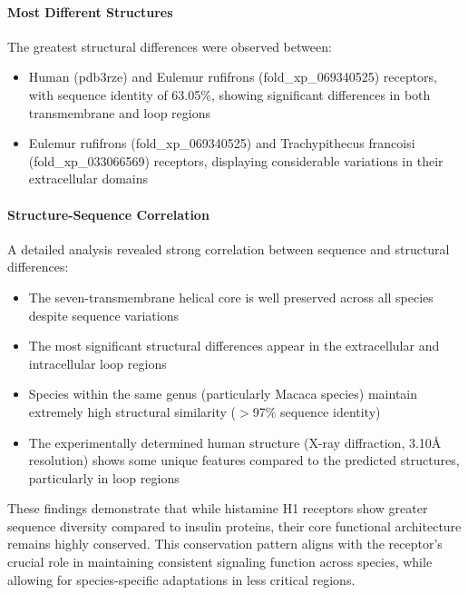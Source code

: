 \documentclass[11pt, a4paper, hidelinks]{article}
\begin{document}
\paragraph{Most Different Structures} The greatest structural differences were observed between:
\begin{itemize}
    \item Human (pdb3rze) and Eulemur rufifrons (fold\_xp\_069340525) receptors, with sequence identity of 63.05\%, showing significant differences in both transmembrane and loop regions
    \item Eulemur rufifrons (fold\_xp\_069340525) and Trachypithecus francoisi (fold\_xp\_033066569) receptors, displaying considerable variations in their extracellular domains
\end{itemize}

\paragraph{Structure-Sequence Correlation} A detailed analysis revealed strong correlation between sequence and structural differences:
\begin{itemize}
    \item The seven-transmembrane helical core is well preserved across all species despite sequence variations
    \item The most significant structural differences appear in the extracellular and intracellular loop regions
    \item Species within the same genus (particularly Macaca species) maintain extremely high structural similarity ($>$97\% sequence identity)
    \item The experimentally determined human structure (X-ray diffraction, 3.10\AA{} resolution) shows some unique features compared to the predicted structures, particularly in loop regions
\end{itemize}

These findings demonstrate that while histamine H1 receptors show greater sequence diversity compared to insulin proteins, their core functional architecture remains highly conserved. This conservation pattern aligns with the receptor's crucial role in maintaining consistent signaling function across species, while allowing for species-specific adaptations in less critical regions.
\end{document}

